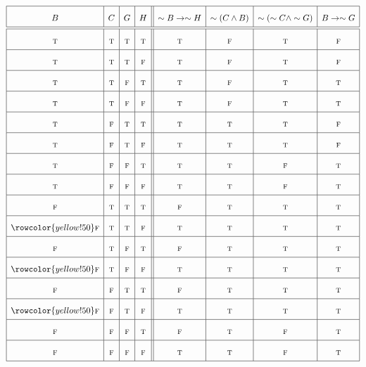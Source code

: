 \documentclass{article}
\newenvironment{Solution}
{\noindent\color{red}}
{\newline}
\begin{document}
\begin{Solution}
    $$
    \renewcommand{\arraystretch}{2}
    \begin{array}{|c|c|c|c||c|c|c|c|}
    \hline
    B&C&G&H&\sim B \rightarrow \sim H&\sim (C \land B)&\sim (\sim C \land \sim G)&B \rightarrow \sim G \\
    \hline\hline
    \textsc{t}&\textsc{t}&\textsc{t}&\textsc{t}&\textsc{t}&\textsc{f}&\textsc{t}&\textsc{f} \\
    \hline
    \textsc{t}&\textsc{t}&\textsc{t}&\textsc{f}&\textsc{t}&\textsc{f}&\textsc{t}&\textsc{f} \\
    \hline
    \textsc{t}&\textsc{t}&\textsc{f}&\textsc{t}&\textsc{t}&\textsc{f}&\textsc{t}&\textsc{t} \\
    \hline
    \textsc{t}&\textsc{t}&\textsc{f}&\textsc{f}&\textsc{t}&\textsc{f}&\textsc{t}&\textsc{t} \\
    \hline
    \textsc{t}&\textsc{f}&\textsc{t}&\textsc{t}&\textsc{t}&\textsc{t}&\textsc{t}&\textsc{f} \\
    \hline
    \textsc{t}&\textsc{f}&\textsc{t}&\textsc{f}&\textsc{t}&\textsc{t}&\textsc{t}&\textsc{f} \\
    \hline
    \textsc{t}&\textsc{f}&\textsc{f}&\textsc{t}&\textsc{t}&\textsc{t}&\textsc{f}&\textsc{t} \\
    \hline
    \textsc{t}&\textsc{f}&\textsc{f}&\textsc{f}&\textsc{t}&\textsc{t}&\textsc{f}&\textsc{t} \\
    \hline
    \textsc{f}&\textsc{t}&\textsc{t}&\textsc{t}&\textsc{f}&\textsc{t}&\textsc{t}&\textsc{t} \\
    \hline
    \rowcolor{yellow!50}
    \textsc{f}&\textsc{t}&\textsc{t}&\textsc{f}&\textsc{t}&\textsc{t}&\textsc{t}&\textsc{t} \\
    \hline
    \textsc{f}&\textsc{t}&\textsc{f}&\textsc{t}&\textsc{f}&\textsc{t}&\textsc{t}&\textsc{t} \\
    \hline
    \rowcolor{yellow!50}
    \textsc{f}&\textsc{t}&\textsc{f}&\textsc{f}&\textsc{t}&\textsc{t}&\textsc{t}&\textsc{t} \\
    \hline
    \textsc{f}&\textsc{f}&\textsc{t}&\textsc{t}&\textsc{f}&\textsc{t}&\textsc{t}&\textsc{t} \\
    \hline
    \rowcolor{yellow!50}
    \textsc{f}&\textsc{f}&\textsc{t}&\textsc{f}&\textsc{t}&\textsc{t}&\textsc{t}&\textsc{t} \\
    \hline
    \textsc{f}&\textsc{f}&\textsc{f}&\textsc{t}&\textsc{f}&\textsc{t}&\textsc{f}&\textsc{t} \\
    \hline
    \textsc{f}&\textsc{f}&\textsc{f}&\textsc{f}&\textsc{t}&\textsc{t}&\textsc{f}&\textsc{t} \\
    \hline
    
\end{array}
    $$

    \phantom{ }
\end{Solution}
\end{document}
